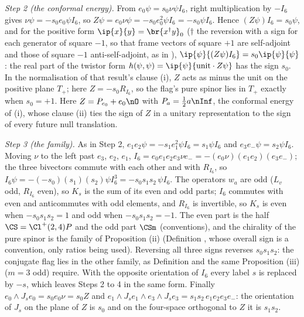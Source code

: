 \emph{Step 2 (the conformal energy).} From $e_{0}\psi = s_{0}\nu\psi I_{6}$, right multiplication by $-I_{6}$ gives $\nu\psi = -s_{0}e_{0}\psi I_{6}$, so $Z\psi = e_{0}\nu\psi = -s_{0}e_{0}^{2}\psi I_{6} = -s_{0}\psi I_{6}$. Hence $(Z\psi)I_{6} = s_{0}\psi$, and for the positive form $\ip{x}{y} = \br{x^{\dagger}y}_{0}$ ($\dagger$ the reversion with a sign for each generator of square $-1$, so that frame vectors of square $+1$ are self-adjoint and those of square $-1$ anti-self-adjoint, as in ), $\ip{\psi}{(Z\psi)I_{6}} = s_{0}\ip{\psi}{\psi}$: the real part of the twistor form $h(\psi, \psi) = \ip{\psi}{\mathrm{unit}\cdot Z\psi}$ has the sign $s_{0}$. In the normalisation of that result's clause (i), $Z$ acts as minus the unit on the positive plane $T_{+}$; here $Z = -s_{0}R_{I_{6}}$, so the flag's pure spinor lies in $T_{+}$ exactly when $s_{0} = +1$. Here $Z = P_{e_{0}} + e_{0}\nO$ with $P_{a} = \tfrac12 a\nInf$, the conformal energy of (i), whose clause (ii) ties the sign of $Z$ in a unitary representation to the sign of every future null translation.

\emph{Step 3 (the family).} As in Step 2, $e_{1}e_{2}\psi = -s_{1}e_{1}^{2}\psi I_{6} = s_{1}\psi I_{6}$ and $e_{3}e_{-}\psi = s_{2}\psi I_{6}$. Moving $\nu$ to the left past $e_{3}$, $e_{2}$, $e_{1}$, $I_{6} = e_{0}e_{1}e_{2}e_{3}\nu e_{-} = -(e_{0}\nu)(e_{1}e_{2})(e_{3}e_{-})$; the three bivectors commute with each other and with $R_{I_{6}}$, so $I_{6}\psi = -(-s_{0})(s_{1})(s_{2})\psi I_{6}^{3} = -s_{0}s_{1}s_{2}\,\psi I_{6}$. The operators $w_{a}$ are odd ($L_{v}$ odd, $R_{I_{6}}$ even), so $K_{s}$ is the sum of its even and odd parts; $I_{6}$ commutes with even and anticommutes with odd elements, and $R_{I_{6}}$ is invertible, so $K_{s}$ is even when $-s_{0}s_{1}s_{2} = 1$ and odd when $-s_{0}s_{1}s_{2} = -1$. The even part is the half $\CS = \Cl^{+}(2,4)P$ and the odd part $\CSm$ (conventions), and the chirality of the pure spinor is the family of Proposition (ii) (Definition , whose overall sign is a convention, only ratios being used). Reversing all three signs reverses $s_{0}s_{1}s_{2}$: the conjugate flag lies in the other family, as Definition  and the same Proposition (iii) ($m = 3$ odd) require. With the opposite orientation of $I_{6}$ every label $s$ is replaced by $-s$, which leaves Steps 2 to 4 in the same form. Finally $e_{0}\wedge J_{s}e_{0} = s_{0}e_{0}\nu = s_{0}Z$ and $e_{1}\wedge J_{s}e_{1}\wedge e_{3}\wedge J_{s}e_{3} = s_{1}s_{2}\,e_{1}e_{2}e_{3}e_{-}$: the orientation of $J_{s}$ on the plane of $Z$ is $s_{0}$ and on the four-space orthogonal to $Z$ it is $s_{1}s_{2}$.

